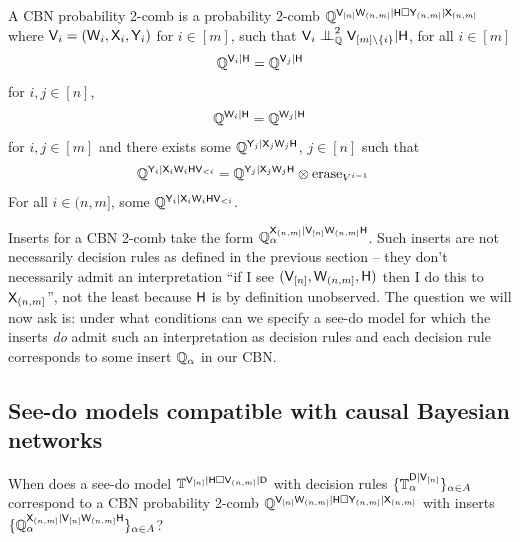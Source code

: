\begin{definition}
A CBN probability 2-comb is a probability 2-comb $\mathbb{Q}^{\mathsf{V}_{[n]}\mathsf{W}_{(n,m]}|\mathsf{H}\square \mathsf{Y}_{(n,m]}|\mathsf{X}_{(n,m]}}$ where $\mathsf{V}_{i} = (\mathsf{W}_i,\mathsf{X}_i,\mathsf{Y}_i)$ for $i\in [m]$, such that $\RV{V}_i\CI^2_{\prob{Q}} \RV{V}_{[m]\setminus\{i\}} |\RV{H}$, for all $i\in [m]$ 
\begin{align}
    \mathbb{Q}^{\mathsf{V}_{i}|\mathsf{H}} = \mathbb{Q}^{\mathsf{V}_j|\mathsf{H}}
\end{align}
for $i,j\in [n]$,
\begin{align}
    \mathbb{Q}^{\mathsf{W}_i|\mathsf{H}} = \mathbb{Q}^{\mathsf{W}_j|\mathsf{H}}
\end{align}
for $i,j\in [m]$ and there exists some $\mathbb{Q}^{\mathsf{Y}_j|\mathsf{X}_j\mathsf{W}_j\mathsf{H}}$, $j\in [n]$ such that
\begin{align}
    \mathbb{Q}^{\mathsf{Y}_i|\mathsf{X}_i\mathsf{W}_i\mathsf{H}\mathsf{V}_{<i}} &= \mathbb{Q}^{\mathsf{Y}_j|\mathsf{X}_j\mathsf{W}_j\mathsf{H}}\otimes \text{erase}_{V^{i-1}}
\end{align}
For all $i\in (n,m]$, some $\mathbb{Q}^{\mathsf{Y}_i|\mathsf{X}_i\mathsf{W}_i\mathsf{H}\mathsf{V}_{<i}}$.
\end{definition}

Inserts for a CBN 2-comb take the form $\mathbb{Q}_\alpha^{\mathsf{X}_{(n,m]}|\mathsf{V}_{[n]}\mathsf{W}_{(n,m]}\mathsf{H}}$. Such inserts are not necessarily decision rules as defined in the previous section -- they don't necessarily admit an interpretation ``if I see $(\mathsf{V}_{[n]},\mathsf{W}_{(n,m]},\mathsf{H})$ then I do this to $\mathsf{X}_{(n,m]}$'', not the least because $\mathsf{H}$ is by definition unobserved. The question we will now ask is: under what conditions can we specify a see-do model for which the inserts \emph{do} admit such an interpretation as decision rules and each decision rule corresponds to some insert $\mathbb{Q}_\alpha$ in our CBN.

\subsection{See-do models compatible with causal Bayesian networks}

When does a see-do model $\mathbb{T}^{\mathsf{V}_{[n]}|\mathsf{H}\square \mathsf{V}_{(n,m]}|\mathsf{D}}$ with decision rules $\{\mathbb{T}_\alpha^{\mathsf{D}|\mathsf{V}_{[n]}}\}_{\alpha\in A}$ correspond to a CBN probability 2-comb $\mathbb{Q}^{\mathsf{V}_{[n]}\mathsf{W}_{(n,m]}|\mathsf{H}\square \mathsf{Y}_{(n,m]}|\mathsf{X}_{(n,m]}}$ with inserts $\{\mathbb{Q}_\alpha^{\mathsf{X}_{(n,m]}|\mathsf{V}_{[n]}\mathsf{W}_{(n,m]}\mathsf{H}}\}_{\alpha\in A}$? 

